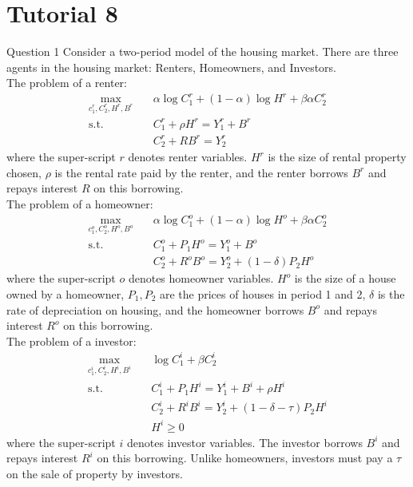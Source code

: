 \documentclass[a4paper]{article}
\begin{document}
\section{Tutorial 8}
	\begin{questionbox}{Question 1}
		Consider a two-period model of the housing market. There are three agents in the housing market: Renters, Homeowners, and Investors.\\
		The problem of a renter:
		\begin{align*}
			\max_{c_1^r,C_2^r,H^r,B^r}\quad &\alpha\log C_1^r + (1-\alpha)\log H^r + \beta\alpha C_2^r\\
			\text{s.t.}\quad &C_1^r + \rho H^r = Y_1^r + B^r\\
			&C_2^r + RB^r = Y_2^r
		\end{align*}
		where the super-script \( r \) denotes renter variables. \( H^r \) is the size of rental property chosen, \( \rho \) is the rental rate paid by the renter, and the renter borrows \( B^r \) and repays interest \( R \) on this borrowing.\\
		The problem of a homeowner:
		\begin{align*}
			\max_{c_1^o,C_2^o,H^o,B^o}\quad &\alpha\log C_1^o + (1-\alpha)\log H^o + \beta\alpha C_2^o\\
			\text{s.t.}\quad &C_1^o + P_1 H^o = Y_1^o + B^o\\
			&C_2^o + R^oB^o = Y_2^o + (1-\delta)P_2H^o
		\end{align*}
		where the super-script \( o \) denotes homeowner variables. \( H^o \) is the size of a house owned by a homeowner, \( P_1,P_2 \) are the prices of houses in period 1 and 2, \( \delta \) is the rate of depreciation on housing, and the homeowner borrows \( B^o \) and repays interest \( R^o \) on this borrowing.\\
		The problem of a investor:
		\begin{align*}
			\max_{c_1^i,C_2^i,H^i,B^i}\quad &\log C_1^i + \beta C_2^i\\
			\text{s.t.}\quad &C_1^i + P_1 H^i = Y_1^i + B^i + \rho H^i\\
			&C_2^i + R^iB^i = Y_2^i + (1-\delta-\tau)P_2H^i\\
			&H^i \geq 0
		\end{align*}
		where the super-script \( i \) denotes investor variables. The investor borrows \( B^i \) and repays interest \( R^i \) on this borrowing. Unlike homeowners, investors must pay a \( \tau \) on the sale of property by investors.
		\begin{enumerate}[(a)]

\end{enumerate}
\end{questionbox}
\end{document}
